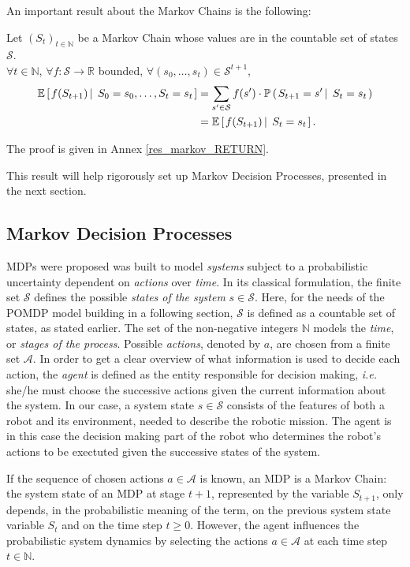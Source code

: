 An important result about the Markov Chains is the following:
\begin{Property} \label{res_markov}
Let $(S_t)_{t \in \mathbb{N}}$ be a Markov Chain 
whose values are in the countable set of states $\mathcal{S}$.\\ 
$\forall t \in \mathbb{N}$, $\forall f: \mathcal{S} \rightarrow \mathbb{R}$ bounded, 
$\forall (s_0,\ldots,s_{t}) \in \mathcal{S}^{t+1}$,
\begin{align*}
\mathbb{E} \left[ \left.  f(S_{t+1}) \, \right| \left. \, S_0 = s_0, \ldots, S_t = s_t  \right. \right]  
&= \sum_{s' \in \mathcal{S}} f(s') \cdot \mathbb{P} \left( \left.  S_{t+1} = s' \, \right| \left. \, S_t = s_t  \right. \right) \\
&= \mathbb{E} \left[ \left.  f(S_{t+1}) \, \right| \left. \, S_t = s_t  \right. \right].
\end{align*}
\end{Property}
The proof is given in Annex \ref{res_markov_RETURN}.

This result will help rigorously set up Markov Decision Processes,
presented in the next section.

\subsection{Markov Decision Processes}
\label{subsection_MDP}
MDPs \cite{puterman94} were proposed
was built to model \textit{systems} 
subject to a probabilistic uncertainty
dependent on \textit{actions} over \textit{time}.
In its classical formulation, the finite set $\mathcal{S}$
defines the possible \textit{states of the system} $s \in \mathcal{S}$.
Here, for the needs of 
the POMDP model building 
in a following section,
$\mathcal{S}$ is defined as a countable set of states, 
as stated earlier.
The set of the non-negative integers $\mathbb{N}$ 
models the \textit{time},
or \textit{stages of the process}.
Possible \textit{actions}, denoted by $a$, 
are chosen from a finite set $\mathcal{A}$.
In order to get a clear overview 
of what information is used 
to decide each action, 
the \textit{agent} is defined as
the entity responsible for decision making,
\textit{i.e.} she/he must choose the successive actions
given the current information about the system.
In our case, a system state $s \in \mathcal{S}$ 
consists of the features of both a robot 
and its environment,
needed to describe the robotic mission.
The agent is in this case 
the decision making part of the robot
who determines the robot's actions
to be exectuted 
given the successive states of the system.

If the sequence of chosen actions $a \in \mathcal{A}$
is known, an MDP is a Markov Chain:
the system state of an MDP at stage $t+1$,
represented by the variable $S_{t+1}$,
only depends, in the probabilistic meaning of the term,
on the previous system state variable $S_t$
and on the time step $t\geqslant 0$.
However, the agent influences the probabilistic system dynamics
by selecting the actions $a \in \mathcal{A}$ 
at each time step $t \in \mathbb{N}$.

